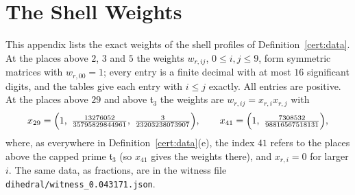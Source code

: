\section{The Shell Weights}\label{fw-data:section}

This appendix lists the exact weights of the shell profiles of
Definition~\ref{cert:data}. At the places above $2$, $3$ and $5$ the weights
$w_{r,ij}$, $0\le i,j\le9$, form symmetric matrices with $w_{r,00}=1$; every
entry is a finite decimal with at most $16$ significant digits, and the tables
give each entry with $i\le j$ exactly. All entries are positive. At the places
above $29$ and above $\mathfrak t_3$ the weights are $w_{r,ij}=x_{r,i}x_{r,j}$
with
\[
 x_{29}=\Bigl(1,\ \tfrac{13276052}{35795829844961},\ \tfrac{3}{23203238073907}\Bigr),\qquad x_{41}=\Bigl(1,\ \tfrac{7308532}{98816567518131}\Bigr),
\]
where, as everywhere in Definition~\ref{cert:data}(e), the index $41$ refers
to the places above the capped prime $\mathfrak t_3$ (so $x_{41}$ gives the
weights there), and $x_{r,i}=0$ for larger $i$. The same data, as fractions, are in the witness
file \texttt{dihedral/witness\_0.043171.json}.

